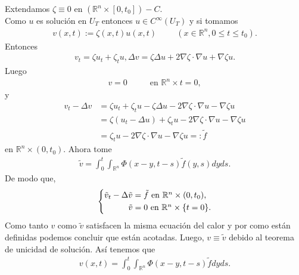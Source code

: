 \begin{homeworkProblem}
\begin{solucion}
    Extendamos $\zeta \equiv 0$ en $(\mathbb{R}^{n} \times [0,t_{0}]) - C$.\\
    Como $u$ es solución en $U_{T}$ entonces $u \in C^{\infty}(U_{T})$ y si tomamos
    \begin{align*}
      v(x,t) := \zeta(x,t)u(x,t) \hspace{1cm} (x\in \mathbb{R}^{n}, 0 \leq t \leq t_{0}). 
    \end{align*}
    Entonces 
    \begin{align*}
      v_{t} = \zeta u_{t} + \zeta_{t}u, \Delta v = \zeta \Delta u + 2 \nabla \zeta \cdot \nabla u + \nabla \zeta u.
    \end{align*}
    Luego 
    \begin{align*}
      v = 0 \hspace{1cm} \text{   en } \mathbb{R}^{n} \times {t=0},
    \end{align*}
    y
    \begin{align*}
      v_{t} - \Delta v &= \zeta u_{t} + \zeta_{t}u - \zeta \Delta u - 2 \nabla \zeta \cdot \nabla u - \nabla \zeta u\\
        &= \zeta (u_{t} - \Delta u) + \zeta_{t}u - 2 \nabla \zeta \cdot \nabla u - \nabla \zeta u\\
        &= \zeta_{t}u - 2 \nabla \zeta \cdot \nabla u - \nabla \zeta u =: \tilde{f}
    \end{align*}
    en $\mathbb{R}^{n} \times (0,t_{0})$. Ahora tome
    \begin{align*}
      \tilde{v} = \int_{0}^{t} \int_{\mathbb{R}^{n}} \Phi(x-y, t-s) \tilde{f}(y,s) dyds.  
    \end{align*}
    De modo que,
    \begin{align*}
     \begin{cases*}
      \tilde{v}_{t} - \Delta \tilde{v} = \tilde{f} \text{ en } \mathbb{R}^{n} \times (0,t_{0}),\\ 
         \hspace{1.02cm} \tilde{v}= 0 \text{ en } \mathbb{R}^{n} \times \{ t=0 \}.
     \end{cases*} 
    \end{align*}
    Como tanto $v$ como $\tilde{v}$ satisfacen la misma ecuación del calor y por como están definidas podemos concluir que están acotadas. Luego, $v \equiv \tilde{v}$ debido al teorema de unicidad de solución. Así tenemos que
    \begin{align*}
      v(x,t) = \int_{0}^{t} \int_{\mathbb{R}^{n}} \Phi(x-y,t-s) \tilde{f}dyds.
    \end{align*}  

\end{solucion}
\end{homeworkProblem}
